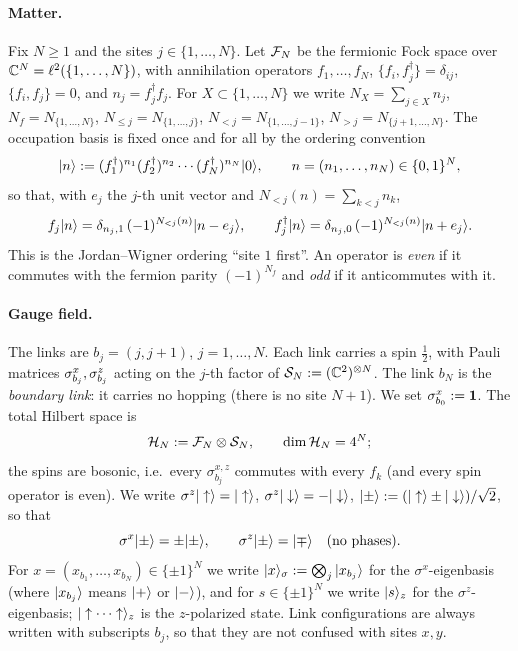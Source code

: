 \paragraph{Matter.}
Fix $N\ge 1$ and the sites $j\in\{1,\dots,N\}$.  Let $\mathcal{F}_N$ be the fermionic Fock space over
$\mathbb{C}^N=\ell^2(\{1,\dots,N\})$, with annihilation operators $f_1,\dots,f_N$,
$\{f_i,f_j^\dagger\}=\delta_{ij}$, $\{f_i,f_j\}=0$, and $n_j=f_j^\dagger f_j$.  For
$X\subset\{1,\dots,N\}$ we write $N_X=\sum_{j\in X}n_j$, $N_f=N_{\{1,\dots,N\}}$,
$N_{\le j}=N_{\{1,\dots,j\}}$, $N_{<j}=N_{\{1,\dots,j-1\}}$, $N_{>j}=N_{\{j+1,\dots,N\}}$.
The occupation basis is fixed once and for all by the ordering convention
\begin{equation}\label{eq:occbasis}
  |n\rangle:=(f_1^\dagger)^{n_1}(f_2^\dagger)^{n_2}\cdots(f_N^\dagger)^{n_N}|0\rangle,\qquad
  n=(n_1,\dots,n_N)\in\{0,1\}^N ,
\end{equation}
so that, with $e_j$ the $j$-th unit vector and $N_{<j}(n)=\sum_{k<j}n_k$,
\begin{equation}\label{eq:fsign}
  f_j|n\rangle=\delta_{n_j,1}\,(-1)^{N_{<j}(n)}|n-e_j\rangle,\qquad
  f_j^\dagger|n\rangle=\delta_{n_j,0}\,(-1)^{N_{<j}(n)}|n+e_j\rangle.
\end{equation}
This is the Jordan--Wigner ordering ``site $1$ first''.  An operator is \emph{even} if it commutes
with the fermion parity $(-1)^{N_f}$ and \emph{odd} if it anticommutes with it.

\paragraph{Gauge field.}
The links are $b_j=(j,j+1)$, $j=1,\dots,N$.  Each link carries a spin $\tfrac12$, with Pauli
matrices $\sigma^{x}_{b_{j}},\sigma^{z}_{b_{j}}$ acting on the $j$-th factor of $\mathcal{S}_N:=(\mathbb{C}^2)^{\otimes N}$.  The
link $b_N$ is the \emph{boundary link}: it carries no hopping (there is no site $N+1$).  We set
$\sigma^{x}_{b_{0}}:=\mathbf{1}$.  The total Hilbert space is
\begin{equation}\label{eq:HilbertN}
  \mathcal{H}_N:=\mathcal{F}_N\otimes\mathcal{S}_N,\qquad \dim\mathcal{H}_N=4^N ;
\end{equation}
the spins are bosonic, i.e.\ every $\sigma^{x,z}_{b_j}$ commutes with every $f_k$ (and every
spin operator is even).  We write $\sigma^z|\uparrow\rangle=|\uparrow\rangle$,
$\sigma^z|\downarrow\rangle=-|\downarrow\rangle$, $|\pm\rangle:=(|\uparrow\rangle\pm|\downarrow\rangle)/\sqrt2$,
so that
\begin{equation}\label{eq:szflip}
  \sigma^x|\pm\rangle=\pm|\pm\rangle,\qquad \sigma^z|\pm\rangle=|\mp\rangle\quad\text{(no phases).}
\end{equation}
For $x=(x_{b_1},\dots,x_{b_N})\in\{\pm1\}^N$ we write $|x\rangle_\sigma:=\bigotimes_{j}|x_{b_j}\rangle$
for the $\sigma^x$-eigenbasis (where $|x_{b_j}\rangle$ means $|+\rangle$ or $|-\rangle$), and for
$s\in\{\pm1\}^N$ we write $|s\rangle_z$ for the $\sigma^z$-eigenbasis; $|\uparrow\cdots\uparrow\rangle_z$
is the $z$-polarized state.  Link configurations are always written with subscripts $b_j$, so that
they are not confused with sites $x,y$.

